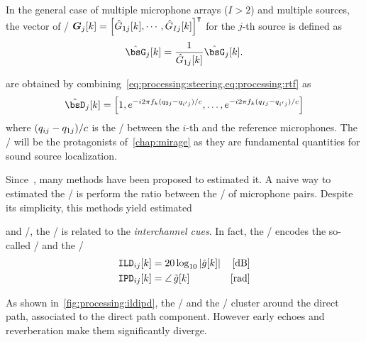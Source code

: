 In the general case of multiple microphone arrays ($I>2$) and multiple sources, the vector of \ReTFs/
$\boldsymbol{G}_j[k] = \ktranspose{\klist{\hat{G}_ {1j}[k], \cdots, \hat{G}_{Ij}[k]}}$
for the $j$-th source is defined as
\begin{equation}
    \hat{\bsG}_j[k] = \frac{1}{\hat{G}_{1j}[k]} \hat{\bsG}_j[k]
    .
\end{equation}


 are obtained by combining~\cref{eq:processing:steering,eq:processing:rtf} as
\begin{equation}\label{eq:processing:relativesteering}
    \hat{\bsD}_{j}[k] = \klist{
                         1,
                         \cste^{-\csti 2 \pi f_k (\distMicSrc_{2j}-\distMicSrc_{i'j}) / \speedOfSound},
                         \ldots,
                         \cste^{-\csti 2 \pi f_k (\distMicSrc_{Ij}-\distMicSrc_{i'j}) / \speedOfSound}
                    }
\end{equation}
where $(q_{ij}-q_{1j}) / c$ is the \TDOA/ between the $i$-th and the reference microphones.
The \TDOAs/ will be the protagonists of~\cref{chap:mirage} as they are fundamental quantities for sound source localization.

Since~, many methods have been proposed to estimated it.
A na\:ive way to estimated the \ReTF/ is perform the ratio between the \DFT/ of microphone pairs.
Despite its simplicity, this methods yield estimated


 and \CASA/, the \ReTF/ is related to the \textit{interchannel cues}.
In fact, the \ReTFs/ encodes the so-called \ILD/ and the \IPD/
\begin{equation}
    \begin{aligned}
        \ild_{ij}[k] &= 20 \log_{10} \magnitudeOf{\rtf[k]} & [\si{\dB}]\\
        \ipd_{ij}[k] &= \phaseOf{\rtf[k]} \mathspace       & [\si{\radian}]
    \end{aligned}
\end{equation}

As shown in~\cref{fig:processing:ildipd}, the \ILD/ and the \IPD/ cluster around the direct path, associated to the direct path component.
However early echoes and reverberation make them significantly diverge.

